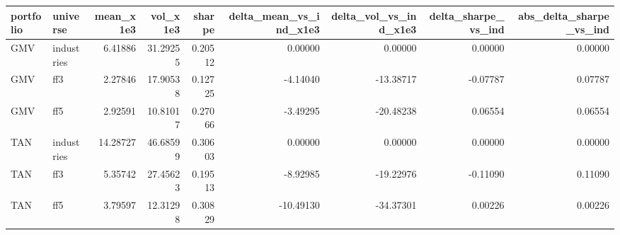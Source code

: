 \begin{tabular}{llrrrrrrr}
\toprule
portfolio & universe & mean\_x1e3 & vol\_x1e3 & sharpe & delta\_mean\_vs\_ind\_x1e3 & delta\_vol\_vs\_ind\_x1e3 & delta\_sharpe\_vs\_ind & abs\_delta\_sharpe\_vs\_ind \\
\midrule
GMV & industries & 6.41886 & 31.29255 & 0.20512 & 0.00000 & 0.00000 & 0.00000 & 0.00000 \\
GMV & ff3 & 2.27846 & 17.90538 & 0.12725 & -4.14040 & -13.38717 & -0.07787 & 0.07787 \\
GMV & ff5 & 2.92591 & 10.81017 & 0.27066 & -3.49295 & -20.48238 & 0.06554 & 0.06554 \\
TAN & industries & 14.28727 & 46.68599 & 0.30603 & 0.00000 & 0.00000 & 0.00000 & 0.00000 \\
TAN & ff3 & 5.35742 & 27.45623 & 0.19513 & -8.92985 & -19.22976 & -0.11090 & 0.11090 \\
TAN & ff5 & 3.79597 & 12.31298 & 0.30829 & -10.49130 & -34.37301 & 0.00226 & 0.00226 \\
\bottomrule
\end{tabular}
